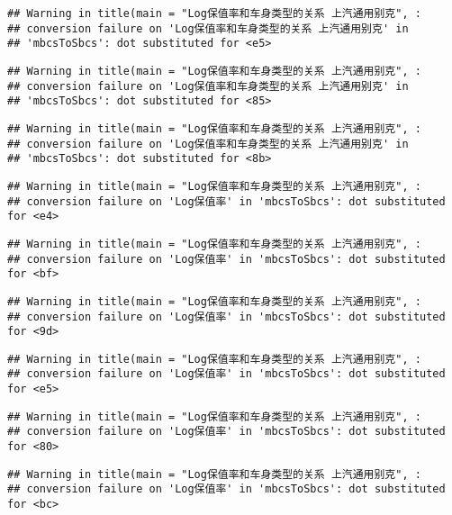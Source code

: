 \documentclass[]{article}
\begin{document}
\begin{verbatim}
## Warning in title(main = "Log保值率和车身类型的关系 上汽通用别克", :
## conversion failure on 'Log保值率和车身类型的关系 上汽通用别克' in
## 'mbcsToSbcs': dot substituted for <e5>
\end{verbatim}

\begin{verbatim}
## Warning in title(main = "Log保值率和车身类型的关系 上汽通用别克", :
## conversion failure on 'Log保值率和车身类型的关系 上汽通用别克' in
## 'mbcsToSbcs': dot substituted for <85>
\end{verbatim}

\begin{verbatim}
## Warning in title(main = "Log保值率和车身类型的关系 上汽通用别克", :
## conversion failure on 'Log保值率和车身类型的关系 上汽通用别克' in
## 'mbcsToSbcs': dot substituted for <8b>
\end{verbatim}

\begin{verbatim}
## Warning in title(main = "Log保值率和车身类型的关系 上汽通用别克", :
## conversion failure on 'Log保值率' in 'mbcsToSbcs': dot substituted for <e4>
\end{verbatim}

\begin{verbatim}
## Warning in title(main = "Log保值率和车身类型的关系 上汽通用别克", :
## conversion failure on 'Log保值率' in 'mbcsToSbcs': dot substituted for <bf>
\end{verbatim}

\begin{verbatim}
## Warning in title(main = "Log保值率和车身类型的关系 上汽通用别克", :
## conversion failure on 'Log保值率' in 'mbcsToSbcs': dot substituted for <9d>
\end{verbatim}

\begin{verbatim}
## Warning in title(main = "Log保值率和车身类型的关系 上汽通用别克", :
## conversion failure on 'Log保值率' in 'mbcsToSbcs': dot substituted for <e5>
\end{verbatim}

\begin{verbatim}
## Warning in title(main = "Log保值率和车身类型的关系 上汽通用别克", :
## conversion failure on 'Log保值率' in 'mbcsToSbcs': dot substituted for <80>
\end{verbatim}

\begin{verbatim}
## Warning in title(main = "Log保值率和车身类型的关系 上汽通用别克", :
## conversion failure on 'Log保值率' in 'mbcsToSbcs': dot substituted for <bc>
\end{verbatim}
\end{document}
